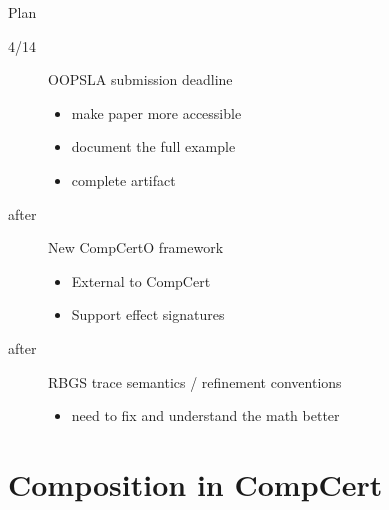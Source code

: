\documentclass[aspectratio=1610,12pt]{beamer}
\begin{document}
\begin{frame}{Plan} %
\begin{description}
  \item[4/14] OOPSLA submission deadline
    \begin{itemize}
      \item make paper more accessible
      \item document the full example
      \item complete artifact
    \end{itemize}
  \item[after] New CompCertO framework
    \begin{itemize}
      \item External to CompCert
      \item Support effect signatures
    \end{itemize}
  \item[after] RBGS trace semantics / refinement conventions
    \begin{itemize}
      \item need to fix and understand the math better
    \end{itemize}
\end{description}
\end{frame}

\section{Composition in CompCert} %
\end{document}
